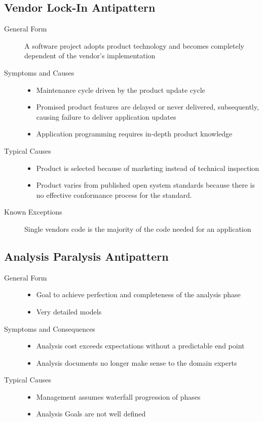 \subsection{Vendor Lock-In Antipattern}
\begin{description}
  \item[General Form] A software project adopts product technology and becomes completely dependent of the vendor's implementation
  \item[Symptoms and Causes] \hfill
  \begin{itemize}
    \item Maintenance cycle driven by the product update cycle
    \item Promised product features are delayed or never delivered, subsequently, causing failure to deliver application updates
    \item Application programming requires in-depth product knowledge
  \end{itemize}
  \item[Typical Causes] \hfill
  \begin{itemize}
    \item Product is selected because of marketing instead of technical inspection
    \item Product varies from published open system standards because there is no effective conformance process for the standard.
  \end{itemize}
  \item[Known Exceptions] Single vendors code is the majority of the code needed for an application
\end{description}
\newpage

\subsection{Analysis Paralysis Antipattern}
\begin{description}
  \item[General Form] \hfill
  \begin{itemize}
    \item Goal to achieve perfection and completeness of the analysis phase
    \item Very detailed models
  \end{itemize}
  \item[Symptoms and Consequences] \hfill
  \begin{itemize}
    \item Analysis cost exceeds expectations without a predictable end point
    \item Analysis documents no longer make sense to the domain experts
  \end{itemize}
  \item[Typical Causes] \hfill
  \begin{itemize}
    \item Management assumes waterfall progression of phases
    \item Analysis Goals are not well defined
  \end{itemize}
\end{description}
\newpage

